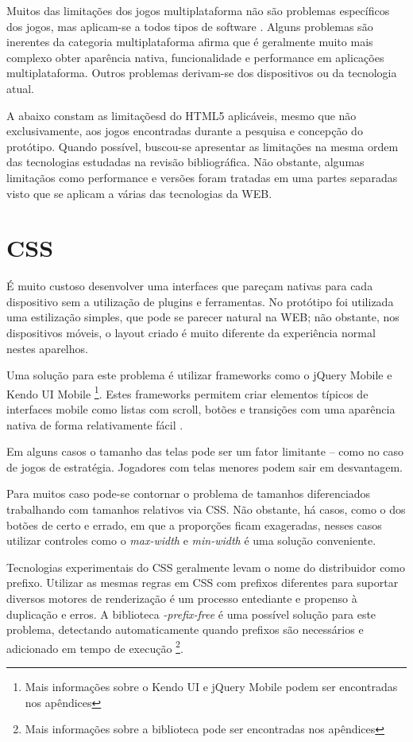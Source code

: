 
Muitos das limitações dos jogos multiplataforma não são
problemas específicos dos jogos, mas aplicam-se a todos tipos
de software \autocite[pp. 3]{currentStateCrossPlatform}. Alguns
problemas são inerentes da categoria multiplataforma \cite[pp.
7 ]{viabilityBusinessApplications} afirma que é geralmente muito
mais complexo obter aparência nativa, funcionalidade e performance
em aplicações multiplataforma. Outros problemas derivam-se dos
dispositivos ou da tecnologia atual.

A abaixo constam as limitaçõesd do HTML5 aplicáveis, mesmo que não
exclusivamente, aos jogos encontradas durante a pesquisa e concepção
do protótipo. Quando possível, buscou-se apresentar as limitações
na mesma ordem das tecnologias estudadas na revisão bibliográfica.
Não obstante, algumas limitaçãos como performance e versões foram
tratadas em uma partes separadas visto que se aplicam a várias das
tecnologias da WEB.

\section{CSS}

É muito custoso desenvolver uma interfaces que pareçam nativas para
cada dispositivo sem a utilização de plugins e ferramentas. No
protótipo foi utilizada uma estilização simples, que pode se parecer
natural na WEB; não obstante, nos dispositivos móveis, o layout criado
é muito diferente da experiência normal nestes aparelhos.

Uma solução para este problema é utilizar frameworks como o jQuery
Mobile e Kendo UI Mobile \footnote{Mais informações sobre o Kendo UI
e jQuery Mobile podem ser encontradas nos apêndices}. Estes frameworks
permitem criar elementos típicos de interfaces mobile como listas
com scroll, botões e transições com uma aparência nativa de forma
relativamente fácil \autocite{publishHtml5}.

Em alguns casos o tamanho das telas pode ser um fator limitante – como
no caso de jogos de estratégia. Jogadores com telas menores podem sair
em desvantagem.

Para muitos caso pode-se contornar o problema de tamanhos diferenciados
trabalhando com tamanhos relativos via CSS. Não obstante, há casos,
como o dos botões de certo e errado, em que a proporções ficam
exageradas, nesses casos utilizar controles como o \textit{max-width} e
\textit{min-width} é uma solução conveniente.

Tecnologias experimentais do CSS geralmente levam o nome do distribuidor
como prefixo. Utilizar as mesmas regras em CSS com prefixos
diferentes para suportar diversos motores de renderização é um
processo entediante e propenso à duplicação e erros. A biblioteca
\textit{-prefix-free} é uma possível solução para este problema,
detectando automaticamente quando prefixos são necessários e
adicionado em tempo de execução \footnote{Mais informações sobre a
biblioteca pode ser encontradas nos apêndices}.

